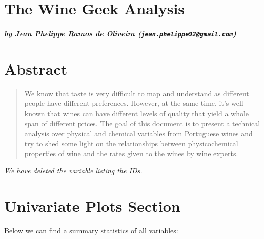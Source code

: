 \documentclass[]{article}
\title{}
\author{}
\date{}
\let\oldsubparagraph\subparagraph
\renewcommand{\subparagraph}[1]{\oldsubparagraph{#1}\mbox{}}
\begin{document}
\hypertarget{the-wine-geek-analysis}{%
\section{The Wine Geek Analysis}\label{the-wine-geek-analysis}}

\hypertarget{by-jean-phelippe-ramos-de-oliveira-jean.phelippe92gmail.com}{%
\subparagraph{\texorpdfstring{by Jean Phelippe Ramos de Oliveira
(\href{mailto:jean.phelippe92@gmail.com}{\nolinkurl{jean.phelippe92@gmail.com}})}{by Jean Phelippe Ramos de Oliveira (jean.phelippe92@gmail.com)}}\label{by-jean-phelippe-ramos-de-oliveira-jean.phelippe92gmail.com}}

\hypertarget{abstract}{%
\section{Abstract}\label{abstract}}

\begin{quote}
We know that taste is very difficult to map and understand as different
people have different preferences. However, at the same time, it's well
known that wines can have different levels of quality that yield a whole
span of different prices. The goal of this document is to present a
technical analysis over physical and chemical variables from Portuguese
wines and try to shed some light on the relationships between
physicochemical properties of wine and the rates given to the wines by
wine experts.
\end{quote}

\emph{We have deleted the variable listing the IDs.}

\hypertarget{univariate-plots-section}{%
\section{Univariate Plots Section}\label{univariate-plots-section}}

Below we can find a summary statistics of all variables:
\end{document}

